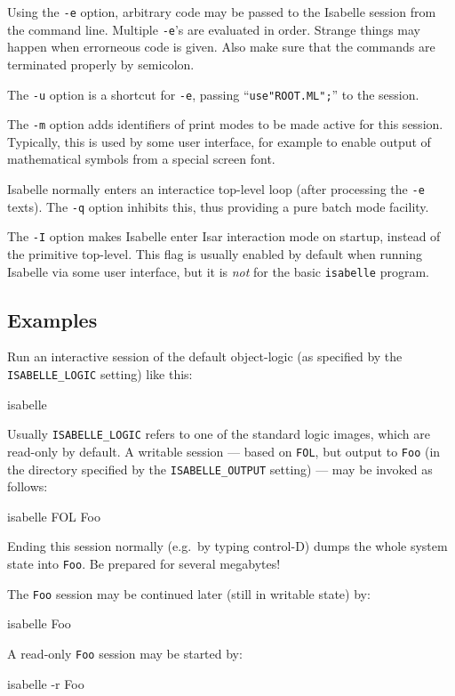 \medskip Using the \texttt{-e} option, arbitrary {\ML} code may be
passed to the Isabelle session from the command line. Multiple
\texttt{-e}'s are evaluated in order. Strange things may happen when
errorneous {\ML} code is given. Also make sure that the {\ML} commands
are terminated properly by semicolon.

\medskip The \texttt{-u} option is a shortcut for \texttt{-e}, passing
``\texttt{use"ROOT.ML";}'' to the {\ML} session.

\medskip The \texttt{-m} option adds identifiers of print modes to be
made active for this session. Typically, this is used by some user
interface, for example to enable output of mathematical symbols from a
special screen font.

\medskip Isabelle normally enters an interactice top-level loop (after
processing the \texttt{-e} texts). The \texttt{-q} option inhibits this, thus
providing a pure batch mode facility.

\medskip The \texttt{-I} option makes Isabelle enter Isar interaction mode on
startup, instead of the primitive {\ML} top-level.  This flag is usually
enabled by default when running Isabelle via some user interface, but it is
\emph{not} for the basic \texttt{isabelle} program.


\subsection*{Examples}

Run an interactive session of the default object-logic (as specified
by the \texttt{ISABELLE_LOGIC} setting) like this:
\begin{ttbox}
isabelle
\end{ttbox}
Usually \texttt{ISABELLE_LOGIC} refers to one of the standard logic
images, which are read-only by default.  A writable session --- based
on \texttt{FOL}, but output to \texttt{Foo} (in the directory
specified by the \texttt{ISABELLE_OUTPUT} setting) --- may be invoked
as follows:
\begin{ttbox}
isabelle FOL Foo
\end{ttbox}
Ending this session normally (e.g.\ by typing control-D) dumps the
whole {\ML} system state into \texttt{Foo}. Be prepared for several
megabytes!

The \texttt{Foo} session may be continued later (still in writable
state) by:
\begin{ttbox}
isabelle Foo
\end{ttbox}
A read-only \texttt{Foo} session may be started by:
\begin{ttbox}
isabelle -r Foo
\end{ttbox}

